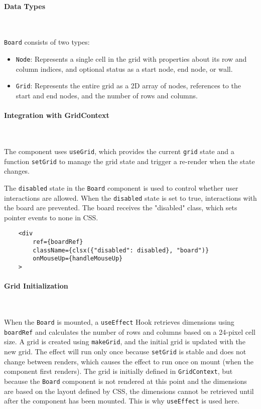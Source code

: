 \paragraph{Data Types} \

\texttt{Board} consists of two types:
\begin{itemize}
    \item \texttt{Node}: Represents a single cell in the grid with properties about its row and column indices, and optional status as a start node, end node, or wall.
    \item \texttt{Grid}: Represents the entire grid as a 2D array of nodes, references to the start and end nodes, and the number of rows and columns.
\end{itemize}

\paragraph{Integration with GridContext} \

The component uses \texttt{useGrid}, which provides the current \texttt{grid} state and a function \texttt{setGrid} to manage the grid state and trigger a re-render when the state changes.

The \texttt{disabled} state in the \texttt{Board} component is used to control whether user interactions are allowed. When the \texttt{disabled} state is set to true, interactions with the board are prevented. The board receives the "disabled" class, which sets pointer events to none in CSS.

\begin{verbatim}
    <div
        ref={boardRef}
        className={clsx({"disabled": disabled}, "board")}
        onMouseUp={handleMouseUp}
    >
\end{verbatim}

\paragraph{Grid Initialization} \

When the \texttt{Board} is mounted, a \texttt{useEffect} Hook retrieves dimensions using \texttt{boardRef} and calculates the number of rows and columns based on a 24-pixel cell size. A grid is created using \texttt{makeGrid}, and the initial grid is updated with the new grid. The effect will run only once because \texttt{setGrid} is stable and does not change between renders, which causes the effect to run once on mount (when the component first renders). The grid is initially defined in \texttt{GridContext}, but because the \texttt{Board} component is not rendered at this point and the dimensions are based on the layout defined by CSS, the dimensions cannot be retrieved until after the component has been mounted. This is why \texttt{useEffect} is used here.

